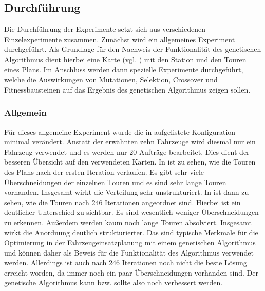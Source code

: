 \subsection{Durchführung}
\label{sec:Durchfuerhung}
Die Durchführung der Experimente setzt sich aus verschiedenen Einzelexperimente zusammen. Zunächst wird ein allgemeines Experiment durchgeführt. Als Grundlage für den Nachweis der Funktionalität des genetischen Algorithmus dient hierbei eine Karte (vgl. ) mit den Station und den Touren eines Plans. Im Anschluss werden dann spezielle Experimente durchgeführt, welche die Auswirkungen von Mutationen, Selektion, Crossover und Fitnessbausteinen auf das Ergebnis des genetischen Algorithmus zeigen sollen.

\subsubsection{Allgemein}
\label{sec:Allgemein}
Für dieses allgemeine Experiment wurde die in  aufgelistete Konfiguration minimal verändert. Anstatt der erwähnten zehn Fahrzeuge wird diesmal nur ein Fahrzeug verwendet und es werden nur 20 Aufträge bearbeitet. Dies dient der besseren Übersicht auf den verwendeten Karten. In  ist zu sehen, wie die Touren des Plans nach der ersten Iteration verlaufen. Es gibt sehr viele Überschneidungen der einzelnen Touren und es sind sehr lange Touren vorhanden. Insgesamt wirkt die Verteilung sehr unstrukturiert. In  ist dann zu sehen, wie die Touren nach 246 Iterationen angeordnet sind. Hierbei ist ein deutlicher Unterschied zu  sichtbar. Es sind wesentlich weniger Überschneidungen zu erkennen. Außerdem werden kaum noch lange Touren absolviert. Insgesamt wirkt die Anordnung deutlich strukturierter. Das sind typische Merkmale für die Optimierung in der Fahrzeugeinsatzplanung mit einem genetischen Algorithmus und können daher als Beweis für die Funktionalität des Algorithmus verwendet werden. Allerdings ist auch nach 246 Iterationen noch nicht die beste Lösung erreicht worden, da immer noch ein paar Überschneidungen vorhanden sind. Der genetische Algorithmus kann bzw. sollte also noch verbessert werden.


